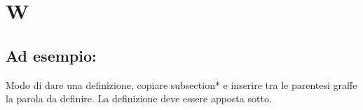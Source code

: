 \section*{W}
\markright{}
\subsection*{Ad esempio:}
Modo di dare una definizione, copiare subsection*{} e inserire tra le parentesi graffe la parola da definire. La definizione deve essere apposta sotto.
